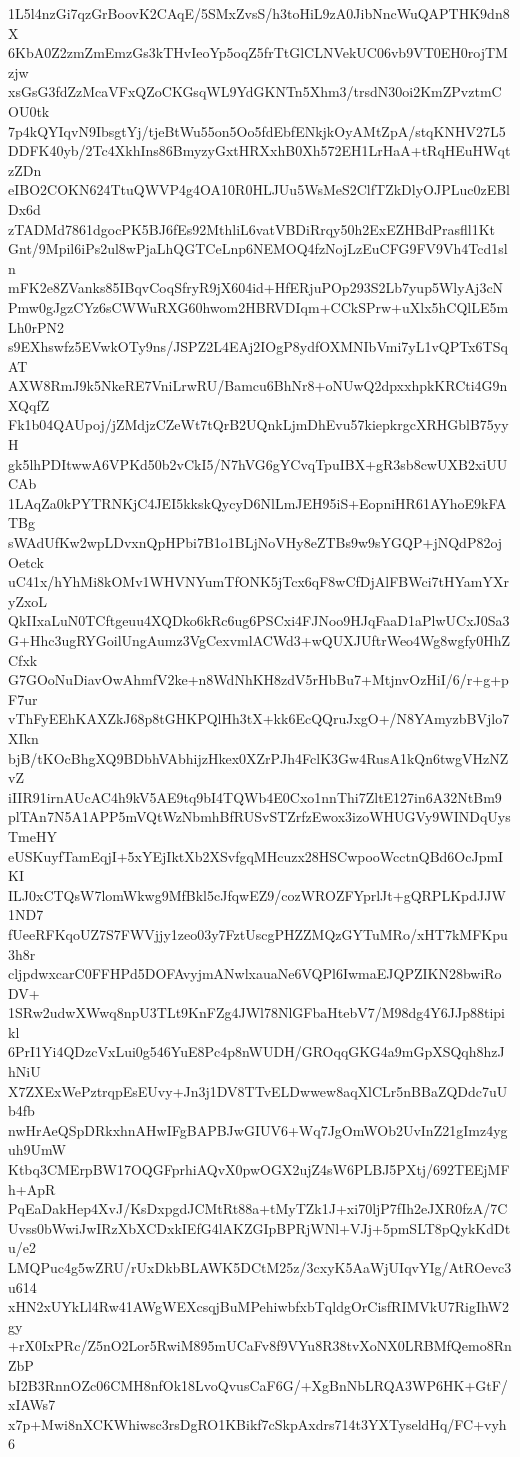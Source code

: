 1L5l4nzGi7qzGrBoovK2CAqE/5SMxZvsS/h3toHiL9zA0JibNncWuQAPTHK9dn8X
6KbA0Z2zmZmEmzGs3kTHvIeoYp5oqZ5frTtGlCLNVekUC06vb9VT0EH0rojTMzjw
xsGsG3fdZzMcaVFxQZoCKGsqWL9YdGKNTn5Xhm3/trsdN30oi2KmZPvztmCOU0tk
7p4kQYIqvN9IbsgtYj/tjeBtWu55on5Oo5fdEbfENkjkOyAMtZpA/stqKNHV27L5
DDFK40yb/2Tc4XkhIns86BmyzyGxtHRXxhB0Xh572EH1LrHaA+tRqHEuHWqtzZDn
eIBO2COKN624TtuQWVP4g4OA10R0HLJUu5WsMeS2ClfTZkDlyOJPLuc0zEBlDx6d
zTADMd7861dgocPK5BJ6fEs92MthliL6vatVBDiRrqy50h2ExEZHBdPrasfll1Kt
Gnt/9Mpil6iPs2ul8wPjaLhQGTCeLnp6NEMOQ4fzNojLzEuCFG9FV9Vh4Tcd1sln
mFK2e8ZVanks85IBqvCoqSfryR9jX604id+HfERjuPOp293S2Lb7yup5WlyAj3cN
Pmw0gJgzCYz6sCWWuRXG60hwom2HBRVDIqm+CCkSPrw+uXlx5hCQlLE5mLh0rPN2
s9EXhswfz5EVwkOTy9ns/JSPZ2L4EAj2IOgP8ydfOXMNIbVmi7yL1vQPTx6TSqAT
AXW8RmJ9k5NkeRE7VniLrwRU/Bamcu6BhNr8+oNUwQ2dpxxhpkKRCti4G9nXQqfZ
Fk1b04QAUpoj/jZMdjzCZeWt7tQrB2UQnkLjmDhEvu57kiepkrgcXRHGblB75yyH
gk5lhPDItwwA6VPKd50b2vCkI5/N7hVG6gYCvqTpuIBX+gR3sb8cwUXB2xiUUCAb
1LAqZa0kPYTRNKjC4JEI5kkskQycyD6NlLmJEH95iS+EopniHR61AYhoE9kFATBg
sWAdUfKw2wpLDvxnQpHPbi7B1o1BLjNoVHy8eZTBs9w9sYGQP+jNQdP82ojOetck
uC41x/hYhMi8kOMv1WHVNYumTfONK5jTcx6qF8wCfDjAlFBWci7tHYamYXryZxoL
QkIIxaLuN0TCftgeuu4XQDko6kRc6ug6PSCxi4FJNoo9HJqFaaD1aPlwUCxJ0Sa3
G+Hhc3ugRYGoilUngAumz3VgCexvmlACWd3+wQUXJUftrWeo4Wg8wgfy0HhZCfxk
G7GOoNuDiavOwAhmfV2ke+n8WdNhKH8zdV5rHbBu7+MtjnvOzHiI/6/r+g+pF7ur
vThFyEEhKAXZkJ68p8tGHKPQlHh3tX+kk6EcQQruJxgO+/N8YAmyzbBVjlo7XIkn
bjB/tKOcBhgXQ9BDbhVAbhijzHkex0XZrPJh4FclK3Gw4RusA1kQn6twgVHzNZvZ
iIIR91irnAUcAC4h9kV5AE9tq9bI4TQWb4E0Cxo1nnThi7ZltE127in6A32NtBm9
plTAn7N5A1APP5mVQtWzNbmhBfRUSvSTZrfzEwox3izoWHUGVy9WINDqUysTmeHY
eUSKuyfTamEqjI+5xYEjIktXb2XSvfgqMHcuzx28HSCwpooWcctnQBd6OcJpmIKI
ILJ0xCTQsW7lomWkwg9MfBkl5cJfqwEZ9/cozWROZFYprlJt+gQRPLKpdJJW1ND7
fUeeRFKqoUZ7S7FWVjjy1zeo03y7FztUscgPHZZMQzGYTuMRo/xHT7kMFKpu3h8r
cljpdwxcarC0FFHPd5DOFAvyjmANwlxauaNe6VQPl6IwmaEJQPZIKN28bwiRoDV+
1SRw2udwXWwq8npU3TLt9KnFZg4JWl78NlGFbaHtebV7/M98dg4Y6JJp88tipikl
6PrI1Yi4QDzcVxLui0g546YuE8Pc4p8nWUDH/GROqqGKG4a9mGpXSQqh8hzJhNiU
X7ZXExWePztrqpEsEUvy+Jn3j1DV8TTvELDwwew8aqXlCLr5nBBaZQDdc7uUb4fb
nwHrAeQSpDRkxhnAHwIFgBAPBJwGIUV6+Wq7JgOmWOb2UvInZ21gImz4yguh9UmW
Ktbq3CMErpBW17OQGFprhiAQvX0pwOGX2ujZ4sW6PLBJ5PXtj/692TEEjMFh+ApR
PqEaDakHep4XvJ/KsDxpgdJCMtRt88a+tMyTZk1J+xi70ljP7fIh2eJXR0fzA/7C
Uvss0bWwiJwIRzXbXCDxkIEfG4lAKZGIpBPRjWNl+VJj+5pmSLT8pQykKdDtu/e2
LMQPuc4g5wZRU/rUxDkbBLAWK5DCtM25z/3cxyK5AaWjUIqvYIg/AtROevc3u614
xHN2xUYkLl4Rw41AWgWEXcsqjBuMPehiwbfxbTqldgOrCisfRIMVkU7RigIhW2gy
+rX0IxPRc/Z5nO2Lor5RwiM895mUCaFv8f9VYu8R38tvXoNX0LRBMfQemo8RnZbP
bI2B3RnnOZc06CMH8nfOk18LvoQvusCaF6G/+XgBnNbLRQA3WP6HK+GtF/xIAWs7
x7p+Mwi8nXCKWhiwsc3rsDgRO1KBikf7cSkpAxdrs714t3YXTyseldHq/FC+vyh6
